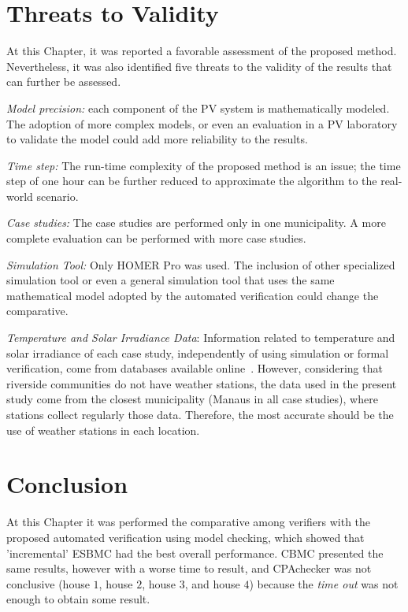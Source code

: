 \section{Threats to Validity}

At this Chapter, it was reported a favorable assessment of the proposed method. %
Nevertheless, it was also identified five threats to the validity of the results that can further be assessed.

\textit{Model precision:} each component of the PV system is mathematically modeled. %
The adoption of more complex models, or even an evaluation in a PV laboratory to validate the model could add more reliability to the results.

\textit{Time step:} The run-time complexity of the proposed method is an issue; the time step of one hour can be further reduced to approximate the algorithm to the real-world scenario.

\textit{Case studies:} The case studies are performed only in one municipality. A more complete evaluation can be performed with more case studies.

\textit{Simulation Tool:} Only HOMER Pro was used. The inclusion of other specialized simulation tool or even a general simulation tool that uses the same mathematical model adopted by the automated verification could change the comparative.

\textit{Temperature and Solar Irradiance Data}: Information related to temperature and solar irradiance of each case study, independently of using simulation or formal verification, come from databases available online~\cite{Temperature, Irradiance}. However, considering that riverside communities do not have weather stations, the data used in the present study come from the closest municipality (Manaus in all case studies), where stations collect regularly those data. Therefore, the most accurate should be the use of weather stations in each location.

\section{Conclusion}

At this Chapter it was performed the comparative among verifiers with the proposed automated verification using model checking, which showed that 'incremental' ESBMC had the best overall performance. CBMC presented the same results, however with a worse time to result, and CPAchecker was not conclusive (house $1$, house $2$, house $3$, and house $4$) because the \textit{time out} was not enough to obtain some result.

